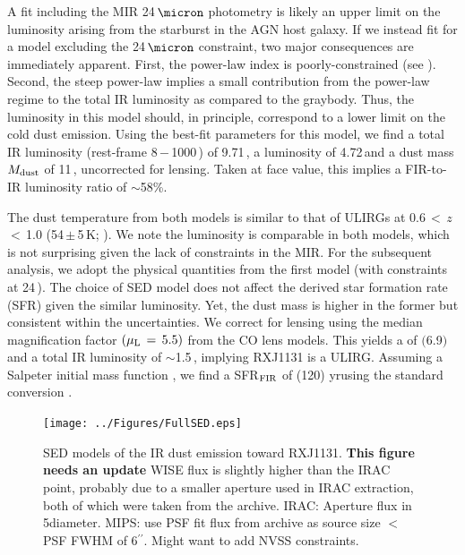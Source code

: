 \documentclass[]{emulateapj}
\begin{document}
A fit including the MIR 24\,$\micron$ photometry
is likely an upper limit on the \fir luminosity arising from the starburst
in the AGN host galaxy.
If we instead fit for a model excluding the 24\,$\micron$ constraint,
two major consequences are immediately apparent.
First, the power-law index is poorly-constrained (see ).
Second, the steep power-law implies a small contribution
from the power-law regime
to the total IR luminosity as compared to the graybody.
Thus, the \fir luminosity in
this model should, in principle, correspond to a
lower limit on the cold dust emission.
Using the best-fit parameters
for this model, we find a total IR luminosity
\LIR (rest-frame 8\,$-$\,1000\,\micron) of 9.71\,\Lsun,
a \fir luminosity \LFIR of 4.72\,\Lsun and a
dust mass $M_{\rm dust}$ of 11\,\Msun, uncorrected for lensing.
Taken at face value, this implies a FIR-to-IR luminosity ratio
of $\sim$58\%.

The dust temperature from both models is similar to that of
ULIRGs at 0.6\,$<$\,$z$\,$<$\,1.0 (54\,$\pm$\,5\,K; \citealt[hereafter C13]{Combes13a}).
We note the \fir luminosity is comparable in both models, which is
not surprising given the lack of constraints in the MIR. 
For the subsequent analysis, we adopt the physical quantities
from the first model (\ie with constraints at 24\,\micron).
The choice of SED model does not affect
the derived star formation rate (SFR) given the similar \fir luminosity.
Yet, the dust mass is higher in the former but consistent within the
uncertainties.
We correct for lensing using the median magnification
factor $(\mu_{\rm L}\,=\,5.5)$
from the CO lens models. This yields a
 \LFIR of $($6.9$)$\,\Lsun
 and 
 a total IR luminosity of $\sim$1.5\,\Lsun,  implying RXJ1131 is a ULIRG.
Assuming a Salpeter initial
mass function \citep{Salpeter55a}, we find a
SFR$_{\rm FIR}$ of (120)\,\Msun\,yr\pmOne using the
standard conversion \citep{Kennicutt98a}.


\begin{figure}[!htbp]
\centering
\texttt{[image: ../Figures/FullSED.eps]}
\caption{SED models of the IR dust emission toward RXJ1131.
{\bf This figure needs an update}
WISE flux is slightly higher than the IRAC point, probably due to a smaller
aperture used in IRAC extraction,
both of which were taken from the archive.
IRAC: Aperture flux in 5\farcs diameter.
MIPS: use PSF fit flux from archive as source size $<$ PSF FWHM of 6$^{\prime\prime}$.
Might want to add NVSS constraints.
\label{fig:SED}}
\end{figure}
\end{document}
